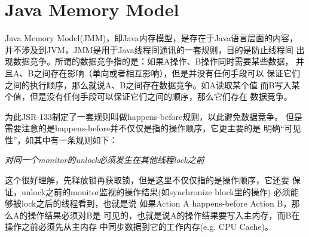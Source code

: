 \section[Java Memory Model]{Java Memory Model}
Java Memory Model(JMM)，即Java内存模型，是存在于Java语言层面的内容，
并不涉及到JVM，JMM是用于Java线程间通讯的一套规则，目的是防止线程间
出现数据竞争。所谓的数据竞争指的是：如果A操作、B操作同时需要某些数据，
并且A、B之间存在影响（单向或者相互影响），但是并没有任何手段可以
保证它们之间的执行顺序，那么就说A、B之间存在数据竞争。如A读取某个值
而B写入某个值，但是没有任何手段可以保证它们之间的顺序，那么它们存在
数据竞争。

为此JSR-133制定了一套规则叫做happens-before规则，以此避免数据竞争。
但是需要注意的是happens-before并不仅仅是指的操作顺序，它更主要的是
明确“可见性”，如其中有一条规则如下：

\emph{对同一个monitor的unlock必须发生在其他线程lock之前}

这个很好理解，先释放锁再获取锁，但是这里不仅仅指的是操作顺序，它还要
保证，unlock之前的monitor监视的操作结果(如synchronize block里的操作)
必须能够被lock之后的线程看到，也就是说
如果Action A happens-before Action B，那么A的操作结果必须对B是
可见的，也就是说A的操作结果要写入主内存，而B在操作之前必须先从主内存
中同步数据到它的工作内存(e.g. CPU Cache)。